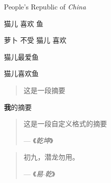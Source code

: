 \documentclass{article}
\newcommand\PRC{People's Republic of \emph{China}}
\newcommand\loves[2]{#1 喜欢 #2}
\newcommand\hateby[2]{#2 不受 #1 喜欢}
\newcommand{\love}[3][喜欢]{#2#1#3}
\newenvironment{myabstract}[1][我的摘要]
{
    \begin{center}\textbf #1\end{center}
    \begin{quote} 
}
{\end{quote}}
\newenvironment{Quotation}[1]
{
    \newcommand\quotesource{#1}
    \begin{quotation}
}
{\par\hfill--- 《\textit{\quotesource}》
\end{quotation}}
\begin{document}
    \PRC

    \loves{猫儿}{鱼}

    \hateby{猫儿}{萝卜}

    \love[最爱]{猫儿}{鱼}

    \love{猫儿}{鱼}

    \begin{abstract}
        这是一段摘要
    \end{abstract}

    \begin{myabstract}
        这是一段自定义格式的摘要
        \par\hfill--- 《\textit{乾坤}》
    \end{myabstract}

    \begin{Quotation}{易$\cdot$乾}
        初九，潜龙勿用。
    \end{Quotation}
\end{document}
